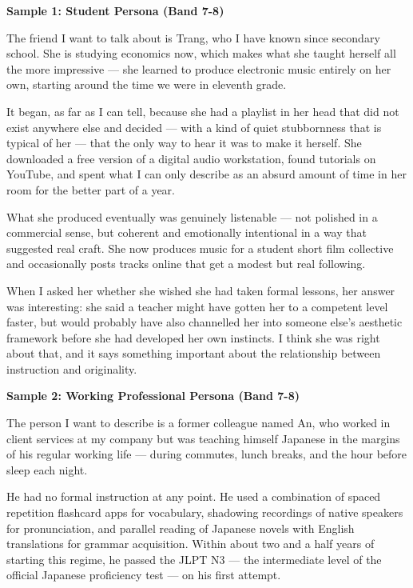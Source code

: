 \begin{ieltsanswer}
\textbf{Sample 1: Student Persona (Band 7-8)}

The friend I want to talk about is Trang, who I have known since secondary school. She is studying economics now, which makes what she taught herself all the more impressive — she learned to produce electronic music entirely on her own, starting around the time we were in eleventh grade.

It began, as far as I can tell, because she had a playlist in her head that did not exist anywhere else and decided — with a kind of quiet stubbornness that is typical of her — that the only way to hear it was to make it herself. She downloaded a free version of a digital audio workstation, found tutorials on YouTube, and spent what I can only describe as an absurd amount of time in her room for the better part of a year.

What she produced eventually was genuinely listenable — not polished in a commercial sense, but coherent and emotionally intentional in a way that suggested real craft. She now produces music for a student short film collective and occasionally posts tracks online that get a modest but real following.

When I asked her whether she wished she had taken formal lessons, her answer was interesting: she said a teacher might have gotten her to a competent level faster, but would probably have also channelled her into someone else's aesthetic framework before she had developed her own instincts. I think she was right about that, and it says something important about the relationship between instruction and originality.

\textbf{Sample 2: Working Professional Persona (Band 7-8)}

The person I want to describe is a former colleague named An, who worked in client services at my company but was teaching himself Japanese in the margins of his regular working life — during commutes, lunch breaks, and the hour before sleep each night.

He had no formal instruction at any point. He used a combination of spaced repetition flashcard apps for vocabulary, shadowing recordings of native speakers for pronunciation, and parallel reading of Japanese novels with English translations for grammar acquisition. Within about two and a half years of starting this regime, he passed the JLPT N3 — the intermediate level of the official Japanese proficiency test — on his first attempt.


\end{ieltsanswer}
